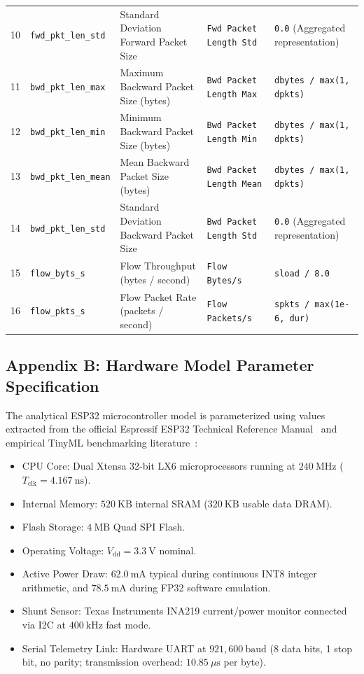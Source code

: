 \begin{table}[h]
{\begin{tabular}{cllll}
10 & \texttt{fwd\_pkt\_len\_std} & Standard Deviation Forward Packet Size & \texttt{Fwd Packet Length Std} & \texttt{0.0} (Aggregated representation) \\
11 & \texttt{bwd\_pkt\_len\_max} & Maximum Backward Packet Size (bytes) & \texttt{Bwd Packet Length Max} & \texttt{dbytes / max(1, dpkts)} \\
12 & \texttt{bwd\_pkt\_len\_min} & Minimum Backward Packet Size (bytes) & \texttt{Bwd Packet Length Min} & \texttt{dbytes / max(1, dpkts)} \\
13 & \texttt{bwd\_pkt\_len\_mean} & Mean Backward Packet Size (bytes) & \texttt{Bwd Packet Length Mean} & \texttt{dbytes / max(1, dpkts)} \\
14 & \texttt{bwd\_pkt\_len\_std} & Standard Deviation Backward Packet Size & \texttt{Bwd Packet Length Std} & \texttt{0.0} (Aggregated representation) \\
15 & \texttt{flow\_byts\_s} & Flow Throughput (bytes / second) & \texttt{Flow Bytes/s} & \texttt{sload / 8.0} \\
16 & \texttt{flow\_pkts\_s} & Flow Packet Rate (packets / second) & \texttt{Flow Packets/s} & \texttt{spkts / max(1e-6, dur)} \\
\hline
\end{tabular}
}
\end{table}

\subsection{Appendix B: Hardware Model Parameter Specification}
The analytical ESP32 microcontroller model is parameterized using values extracted from the official Espressif ESP32 Technical Reference Manual~\cite{espressif2023esp32} and empirical TinyML benchmarking literature~\cite{banbury2021benchmarking}:
\begin{itemize}
    \item CPU Core: Dual Xtensa 32-bit LX6 microprocessors running at $240\ \text{MHz}$ ($T_{\text{clk}} = 4.167\ \text{ns}$).
    \item Internal Memory: $520\ \text{KB}$ internal SRAM ($320\ \text{KB}$ usable data DRAM).
    \item Flash Storage: $4\ \text{MB}$ Quad SPI Flash.
    \item Operating Voltage: $V_{\text{dd}} = 3.3\ \text{V}$ nominal.
    \item Active Power Draw: $62.0\ \text{mA}$ typical during continuous INT8 integer arithmetic, and $78.5\ \text{mA}$ during FP32 software emulation.
    \item Shunt Sensor: Texas Instruments INA219 current/power monitor connected via I2C at $400\ \text{kHz}$ fast mode.
    \item Serial Telemetry Link: Hardware UART at $921,600\ \text{baud}$ (8 data bits, 1 stop bit, no parity; transmission overhead: $10.85\ \mu\text{s}$ per byte).
\end{itemize}

